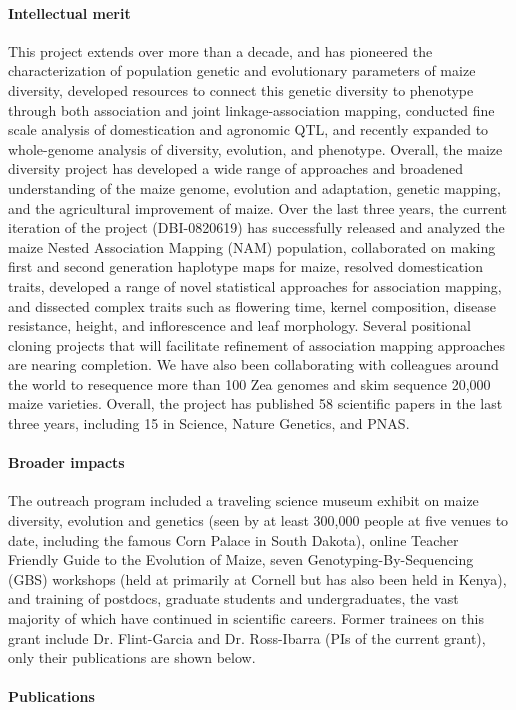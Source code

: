 \paragraph*{Intellectual merit}  This project extends over more than a decade, and has pioneered the characterization of population genetic and evolutionary parameters of maize diversity, developed resources to connect this genetic diversity to phenotype through both association and joint linkage-association mapping, conducted fine scale analysis of domestication and agronomic QTL, and recently expanded to whole-genome analysis of diversity, evolution, and phenotype. Overall, the maize diversity project has developed a wide range of approaches and broadened understanding of the maize genome, evolution and adaptation, genetic mapping, and the agricultural improvement of maize. Over the last three years, the current iteration of the project (DBI-0820619) has successfully released and analyzed the maize Nested Association Mapping (NAM) population, collaborated on making first and second generation haplotype maps for maize, resolved domestication traits, developed a range of novel statistical approaches for association mapping, and dissected complex traits such as flowering time, kernel composition, disease resistance, height, and inflorescence and leaf morphology. Several positional cloning projects that will facilitate refinement of association mapping approaches are nearing completion.  We have also been collaborating with colleagues around the world to resequence more than 100 Zea genomes and skim sequence 20,000 maize varieties. Overall, the project has published 58 scientific papers in the last three years, including 15 in Science, Nature Genetics, and PNAS. \\
\paragraph*{Broader impacts} The outreach program included a traveling science museum exhibit on maize diversity, evolution and genetics (seen by at least 300,000 people at five venues to date, including the famous Corn Palace in South Dakota), online Teacher Friendly Guide to the Evolution of Maize, seven Genotyping-By-Sequencing (GBS) workshops (held at primarily at Cornell but has also been held in Kenya), and training of postdocs, graduate students and undergraduates, the vast majority of which have continued in scientific careers.  Former trainees on this grant include Dr. Flint-Garcia  and Dr. Ross-Ibarra  (PIs of the current grant), only their publications are shown below.
\paragraph*{Publications} \citet{Buckler2009, Flint-Garcia2009, Flint-Garcia2009a, Flint-Garcia2009b, Gore2009, McMullen2009, Ross-Ibarra2009a, Bottoms2010, Dubois2010, Zhang2010a, vanheerwaarden2010a, vanheerwaarden2010b, Brown2011b, Morrell2011a, Studer2011b, vanheerwaarden2011a, Tian2011, Chia2012a, Cook2012a, Fang2012a, Hufford2012b, Hung2012, Hung2012a, Romay2013}
